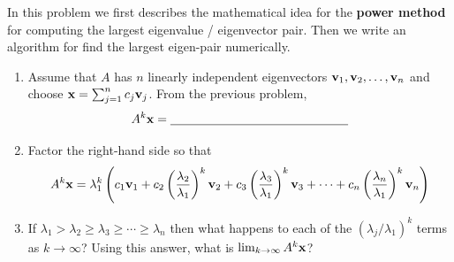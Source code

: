 \begin{problem}
    In this problem  we first describes the mathematical idea for the {\bf power method} for
    computing the largest eigenvalue / eigenvector pair.  Then we write an algorithm for
    find the largest eigen-pair numerically.
    \begin{enumerate}
        \item Assume that $A$ has $n$ linearly independent eigenvectors ${\bf v}_1, {\bf v}_2,
            \dots, {\bf v}_n$ and choose ${\bf x} =
            \sum_{j=1}^n c_j {\bf v}_j$.  From the previous problem,
            \[ A^k {\bf x} = \underline{\hspace{2in}} \]
        \item Factor the right-hand side so that 
            \[ A^k {\bf x} = \lambda_1^k \left( c_1 {\bf v}_1 + c_2 \left(
                \frac{\lambda_2}{\lambda_1} \right)^k {\bf v}_2 + c_3 \left(
                \frac{\lambda_3}{\lambda_1}
                \right)^k {\bf v}_3 + \cdots + c_n \left( \frac{\lambda_n}{\lambda_1}
                \right)^k {\bf v}_n \right) \]
        \item If $\lambda_1 > \lambda_2 \ge \lambda_3 \ge \cdots \ge \lambda_n$ then what
            happens to each of the $(\lambda_j/\lambda_1)^k$ terms as $k \to \infty$?
            Using this answer, what is $\lim_{k \to \infty} A^k {\bf x}$?\\
    \end{enumerate}
\end{problem}

